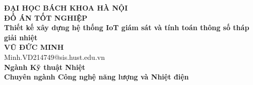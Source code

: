 \documentclass[main.tex]{subfiles}
\begin{document}
\begin{titlepage}
\thispagestyle{empty}
\begin{center}

{\textbf{\large{ĐẠI HỌC BÁCH KHOA HÀ NỘI}}}\\[4cm]

{\textbf{\huge{ ĐỒ ÁN TỐT NGHIỆP}}}\\[1cm]
{\textbf{\Large{Thiết kế xây dựng hệ thống IoT giám sát và tính toán thông số tháp giải nhiệt}}}\\[1cm]

{\textbf{\large{VŨ ĐỨC MINH}}}\\
{\large{Minh.VD214749@sis.hust.edu.vn}}\\[0.5cm]

{\textbf{\large{Ngành Kỹ thuật Nhiệt}}}\\[0.5cm]
{\textbf{\large{Chuyên ngành Công nghệ năng lượng và Nhiệt điện}}}\\[0.5cm]

\vspace{2cm}
\begin{table}[H]
\centering
{}
\end{table}
\end{center}

\end{titlepage}
\end{document}
